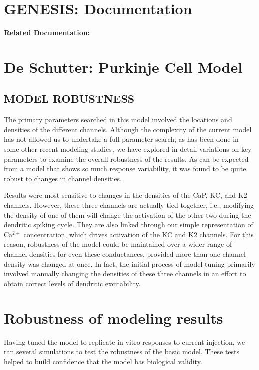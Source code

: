 \documentclass[12pt]{article}
\begin{document}
\section*{GENESIS: Documentation}

{\bf Related Documentation:}

\section*{De Schutter: Purkinje Cell Model}

\subsection*{MODEL ROBUSTNESS}

The primary parameters searched in 
this model involved the locations and densities of the different
channels. Although the complexity of the current
model has not allowed us to undertake a full parameter
search, as has been done in some other recent modeling
studies\,\cite{S:1993dz}, we have explored in detail
variations on key parameters to examine the overall
robustness of the results. As can be expected from a model
that shows so much response variability, it was found to be
quite robust to changes in channel densities.

Results were most sensitive to changes in the densities of
the CaP, KC, and K2 channels. However, these three channels
are actually tied together, i.e., modifying the density of
one of them will change the activation of the other two
during the dendritic spiking cycle. They are also linked
through our simple representation of Ca$^{2+}$ concentration,
which drives activation of the KC and K2 channels. For this
reason, robustness of the model could be maintained over a
wider range of channel densities for even these conductances,
provided more than one channel density was
changed at once. In fact, the initial process of model tuning
primarily involved manually changing the densities of these
three channels in an effort to obtain correct levels of dendritic
excitability.

\section*{Robustness of modeling results}

Having tuned the model to replicate in vitro responses to current injection, we ran several simulations to test the robustness of the basic model. These tests helped to build confidence that the model has biological validity.
\end{document}
